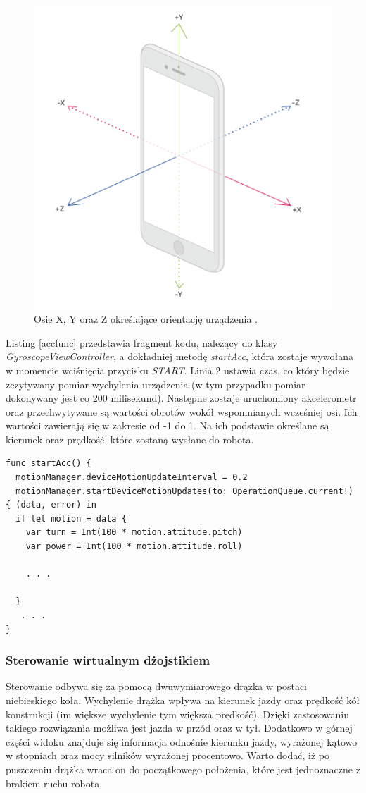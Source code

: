 \begin{figure}[H]
	\centering
		\includegraphics[width=0.6\linewidth]{pic05/axis}
	\caption{Osie X, Y oraz Z określające orientację urządzenia \cite{Axis}.}
	\label{fig:axis}	
\end{figure}

Listing \ref{accfunc} przedstawia fragment kodu, należący do klasy \textit{GyroscopeViewController}, a dokładniej metodę \textit{startAcc}, która zostaje wywołana w momencie wciśnięcia przycisku \textit{START}. Linia 2 ustawia czas, co który będzie zczytywany pomiar wychylenia urządzenia (w tym przypadku pomiar dokonywany jest co 200 milisekund). Następne zostaje uruchomiony akcelerometr oraz przechwytywane są wartości obrotów wokół wspomnianych wcześniej osi. Ich wartości zawierają się w zakresie od -1 do 1. Na ich podstawie określane są kierunek oraz prędkość, które zostaną wysłane do robota.

\begin{minipage}{\textwidth}
	\begin{lstlisting}[label=accfunc,caption=Implementacja metody startAcc.]
func startAcc() {
  motionManager.deviceMotionUpdateInterval = 0.2
  motionManager.startDeviceMotionUpdates(to: OperationQueue.current!) { (data, error) in
  if let motion = data {
    var turn = Int(100 * motion.attitude.pitch)
    var power = Int(100 * motion.attitude.roll)
    
    . . . 

  }
   . . . 
}
	\end{lstlisting}
\end{minipage}

\subsubsection{Sterowanie wirtualnym dżojstikiem}
Sterowanie odbywa się za pomocą dwuwymiarowego drążka w postaci niebieskiego koła. Wychylenie drążka wpływa na kierunek jazdy oraz prędkość kół konstrukcji (im większe wychylenie tym większa prędkość). Dzięki zastosowaniu takiego rozwiązania możliwa jest jazda w przód oraz w tył. Dodatkowo w górnej części widoku znajduje się informacja odnośnie kierunku jazdy, wyrażonej kątowo w stopniach oraz mocy silników wyrażonej procentowo. Warto dodać, iż po puszczeniu drążka wraca on do początkowego położenia, które jest jednoznaczne z brakiem ruchu robota.

